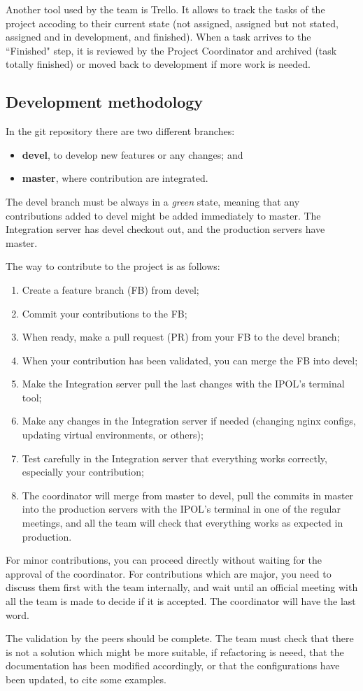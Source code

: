 Another tool used by the team is Trello. It allows to track the tasks of the project accoding to their current state (not assigned, assigned but not stated, assigned and in development, and finished). When a task arrives to the ``Finished" step, it is reviewed by the Project Coordinator and archived (task totally finished) or moved back to development if more work is needed.

\subsection{Development methodology}
In the git repository there are two different branches:
\begin{itemize}
	\item \textbf{devel}, to develop new features or any changes; and
	\item \textbf{master}, where contribution are integrated.
\end{itemize}

The devel branch must be always in a \emph{green} state, meaning that any contributions added to devel might be added immediately to master. The Integration server has devel checkout out, and the production servers have master.

The way to contribute to the project is as follows:
\begin{enumerate}
	\item Create a feature branch (FB) from devel;
	\item Commit your contributions to the FB;
	\item When ready, make a pull request (PR) from your FB to the devel branch;
	\item When your contribution has been validated, you can merge the FB into devel;
	\item Make the Integration server pull the last changes with the IPOL's terminal tool;
	\item Make any changes in the Integration server if needed (changing nginx configs, updating virtual environments, or others);
	\item Test carefully in the Integration server that everything works correctly, especially your contribution;
	\item The coordinator will merge from master to devel, pull the commits in master into the production servers with the IPOL's terminal in one of the regular meetings, and all the team will check that everything works as expected in production.
\end{enumerate}

For minor contributions, you can proceed directly without waiting for the approval of the coordinator.
For contributions which are major, you need to discuss them first with the team internally, and wait until an official meeting with all the team is made to decide if it is accepted. The coordinator will have the last word.

The validation by the peers should be complete. The team must check that there is not a solution which might be more suitable, if refactoring is neeed, that the documentation has been modified accordingly, or that the configurations have been updated, to cite some examples.

